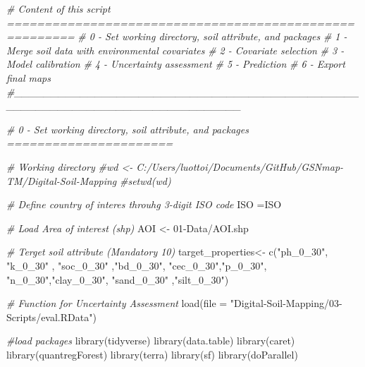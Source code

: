 \documentclass[
  10pt,
  b5paper,
  oneside]{book}
\newenvironment{Shaded}{\begin{snugshade}}{\end{snugshade}}
\newcommand{\AttributeTok}[1]{\textcolor[rgb]{0.77,0.63,0.00}{#1}}
\newcommand{\CommentTok}[1]{\textcolor[rgb]{0.56,0.35,0.01}{\textit{#1}}}
\newcommand{\FunctionTok}[1]{\textcolor[rgb]{0.00,0.00,0.00}{#1}}
\newcommand{\NormalTok}[1]{#1}
\newcommand{\OtherTok}[1]{\textcolor[rgb]{0.56,0.35,0.01}{#1}}
\newcommand{\StringTok}[1]{\textcolor[rgb]{0.31,0.60,0.02}{#1}}
\begin{document}
\begin{Shaded}
\begin{Highlighting}[]
\CommentTok{\# Content of this script =======================================================}
\CommentTok{\# 0 {-} Set working directory, soil attribute, and packages}
\CommentTok{\# 1 {-} Merge soil data with environmental covariates }
\CommentTok{\# 2 {-} Covariate selection}
\CommentTok{\# 3 {-} Model calibration}
\CommentTok{\# 4 {-} Uncertainty assessment}
\CommentTok{\# 5 {-} Prediction}
\CommentTok{\# 6 {-} Export final maps}
\CommentTok{\#\_\_\_\_\_\_\_\_\_\_\_\_\_\_\_\_\_\_\_\_\_\_\_\_\_\_\_\_\_\_\_\_\_\_\_\_\_\_\_\_\_\_\_\_\_\_\_\_\_\_\_\_\_\_\_\_\_\_\_\_\_\_\_\_\_\_\_\_\_\_\_\_\_\_\_\_\_\_\_}


\CommentTok{\# 0 {-} Set working directory, soil attribute, and packages ======================}

\CommentTok{\# Working directory}
\CommentTok{\#wd \textless{}{-} \textquotesingle{}C:/Users/luottoi/Documents/GitHub/GSNmap{-}TM/Digital{-}Soil{-}Mapping\textquotesingle{}}
\CommentTok{\#setwd(wd)}

\CommentTok{\# Define country of interes throuhg 3{-}digit ISO code}
\NormalTok{ISO }\OtherTok{=}\StringTok{\textquotesingle{}ISO\textquotesingle{}}

\CommentTok{\# Load Area of interest (shp)}
\NormalTok{AOI }\OtherTok{\textless{}{-}} \StringTok{\textquotesingle{}01{-}Data/AOI.shp\textquotesingle{}}

\CommentTok{\# Terget soil attribute (Mandatory 10)}
\NormalTok{target\_properties}\OtherTok{\textless{}{-}} \FunctionTok{c}\NormalTok{(}\StringTok{"ph\_0\_30"}\NormalTok{, }\StringTok{"k\_0\_30"}\NormalTok{ , }\StringTok{"soc\_0\_30"}\NormalTok{ ,}\StringTok{"bd\_0\_30"}\NormalTok{, }\StringTok{"cec\_0\_30"}\NormalTok{,}\StringTok{"p\_0\_30"}\NormalTok{,   }
                      \StringTok{"n\_0\_30"}\NormalTok{,}\StringTok{"clay\_0\_30"}\NormalTok{, }\StringTok{"sand\_0\_30"}\NormalTok{ ,}\StringTok{"silt\_0\_30"}\NormalTok{)}

\CommentTok{\# Function for Uncertainty Assessment}
\FunctionTok{load}\NormalTok{(}\AttributeTok{file =} \StringTok{"Digital{-}Soil{-}Mapping/03{-}Scripts/eval.RData"}\NormalTok{)}

\CommentTok{\#load packages}
\FunctionTok{library}\NormalTok{(tidyverse)}
\FunctionTok{library}\NormalTok{(data.table)}
\FunctionTok{library}\NormalTok{(caret)}
\FunctionTok{library}\NormalTok{(quantregForest)}
\FunctionTok{library}\NormalTok{(terra)}
\FunctionTok{library}\NormalTok{(sf)}
\FunctionTok{library}\NormalTok{(doParallel)}
\end{Highlighting}
\end{Shaded}
\end{document}
